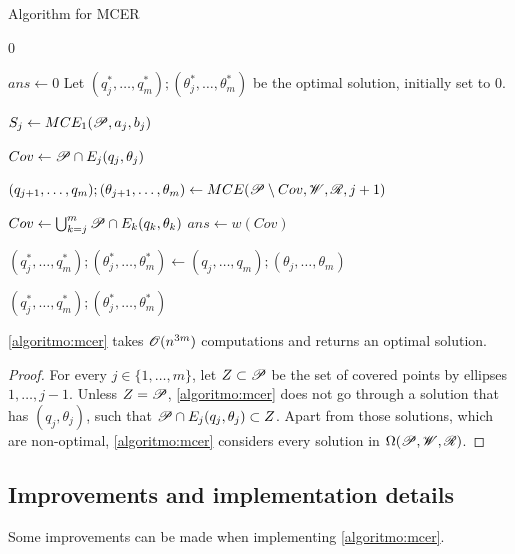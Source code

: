 \begin{algoritmo}
	\caption{Algorithm for MCER}\label{algoritmo:mcer}
	\begin{algorithmic}[1]
		
		
		\item[]
		
		\State \Return $0$
		\EndIf
		
		\State $ans \gets 0$
		\State Let $(q_{j}^*, \dots, q_m^*); (\theta_{j}^*, \dots, \theta_m^*)$ be the optimal solution, initially set to $0$.
		
		\State $S_j \gets MCE_1(\mathscr{P}, a_j, b_j)$

		
		\State $Cov \gets \mathscr{P} \cap E_j(q_j, \theta_j)$
		
		\State $(q_{j+1}, \dots, q_m); (\theta_{j+1}, \dots, \theta_m) \gets  MCE(\mathscr{P}\setminus Cov, \mathscr{W}, \mathscr{R}, j+1)$
		
		
		\State $Cov \gets \bigcup_{k=j}^m \mathscr{P} \cap E_k(q_k, \theta_k)$
			\State $ans \gets w(Cov)$
			
			\State $(q_{j}^*, \dots, q_m^*); (\theta_{j}^*, \dots, \theta_m^*) \gets (q_{j}, \dots, q_m); (\theta_{j}, \dots, \theta_m)$
		\EndIf
		\EndFor
		
		\State \Return $(q_{j}^*, \dots, q_m^*); (\theta_{j}^*, \dots, \theta_m^*)$
		\EndProcedure
	\end{algorithmic}
\end{algoritmo}

\begin{corolario}
	\autoref{algoritmo:mcer} takes $\mathscr{O}(n^{3m})$ computations and returns an optimal solution.
\end{corolario}

\begin{proof}
	For every $j\in\{1, \dots, m\}$, let $Z \subset \mathscr{P}$ be the set of covered points by ellipses $1, \dots, j-1$. 
	Unless $Z=\mathscr{P}$, \autoref{algoritmo:mcer} does not go through a solution that has $(q_j, \theta_j)$, such that $\mathscr{P} \cap E_j(q_j, \theta_j) \subset Z$. Apart from those solutions, which are non-optimal, \autoref{algoritmo:mcer} considers every solution in $\Omega(\mathscr{P}, \mathscr{W}, \mathscr{R})$.
\end{proof}

\subsection{Improvements and implementation details}

Some improvements can be made when implementing \autoref{algoritmo:mcer}.